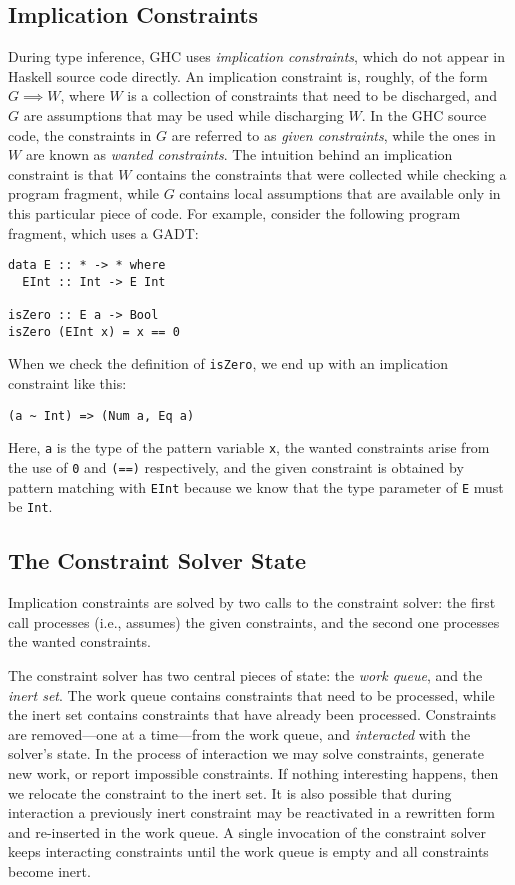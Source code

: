 \documentclass{sigplanconf}
\begin{document}
\subsection{Implication Constraints}
During type inference, GHC uses {\em implication constraints}, which do
not appear in Haskell source code directly. An implication constraint is,
roughly, of the form $G\implies W$, where $W$ is a collection
of constraints that need to be discharged, and $G$ are assumptions that
may be used while discharging $W$.  In the GHC source code, the constraints
in $G$ are referred to as {\em given constraints}, while the ones in $W$ are
known as {\em wanted constraints}.  The intuition behind an implication
constraint is that $W$ contains the constraints that were collected
while checking a program fragment, while $G$ contains local assumptions
that are available only in this particular piece of code.  For example,
consider the following program fragment, which uses a GADT:
\begin{Verbatim}
data E :: * -> * where
  EInt :: Int -> E Int

isZero :: E a -> Bool
isZero (EInt x) = x == 0
\end{Verbatim}
When we check the definition of \Verb"isZero", we end up with an implication
constraint like this:
\begin{Verbatim}
(a ~ Int) => (Num a, Eq a)
\end{Verbatim}
Here, \Verb"a" is the type of the pattern variable \Verb"x", the wanted
constraints arise from the use of \Verb"0" and \Verb"(==)" respectively,
and the given constraint is obtained by pattern matching with \Verb"EInt"
because we know that the type parameter of \Verb"E" must be \Verb"Int".


\subsection{The Constraint Solver State}
Implication constraints are solved by two calls to the constraint solver:
the first call processes (i.e., assumes) the given constraints, and the
second one processes the wanted constraints.

The constraint solver has two central pieces of state: the {\em work queue},
and the {\em inert set}.  The work queue contains constraints that need to be
processed, while the inert set contains constraints that have already
been processed.  Constraints are removed---one at a time---from the work queue,
and {\em interacted} with the solver's state.  In the process of interaction
we may solve constraints, generate new work, or report impossible constraints.
If nothing interesting happens, then we relocate the constraint to the
inert set.  It is also possible that during interaction a previously
inert constraint may be reactivated in a rewritten form and re-inserted
in the work queue.  A single invocation of the constraint solver keeps
interacting constraints until the work queue is empty and all constraints
become inert.
\end{document}
